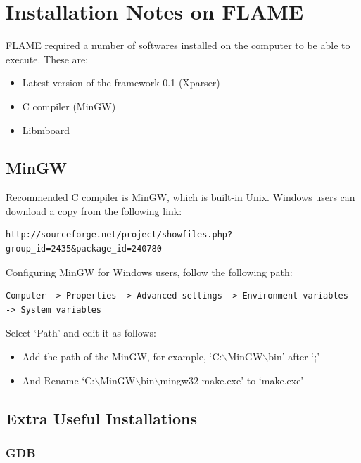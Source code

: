 \documentclass[a4paper,11pt]{article}
\newenvironment{mylisting}
{\begin{list}{}{\setlength{\leftmargin}{1em}}\item\small\bfseries}
{\end{list}}
\begin{document}
\section{Installation Notes on FLAME}\label{sect:getting}
FLAME required a number of softwares installed on the computer to be
able to execute. These are:
\begin{itemize}
\item  Latest version of the framework 0.1 (Xparser)\item  C compiler (MinGW) \item
Libmboard \end{itemize}

\subsection{MinGW}

Recommended C compiler is MinGW, which is built-in Unix. Windows
users can download a copy from the following link:

\begin{mylisting}
\begin{verbatim}
http://sourceforge.net/project/showfiles.php?group_id=2435&package_id=240780
\end{verbatim}
\end{mylisting}

Configuring MinGW for Windows users, follow the following path:

\begin{mylisting}
\begin{verbatim}
Computer -> Properties -> Advanced settings -> Environment variables
-> System variables
\end{verbatim}
\end{mylisting}
Select `Path' and edit it as follows:
\begin{itemize}
\item Add the path of the MinGW, for example, `C:$\backslash$MinGW$\backslash$bin' after `;'
\item And Rename `C:$\backslash$MinGW$\backslash$bin$\backslash$mingw32-make.exe' to `make.exe'
\end{itemize}


\subsection{Extra Useful Installations}

\subsubsection{GDB}
\end{document}
